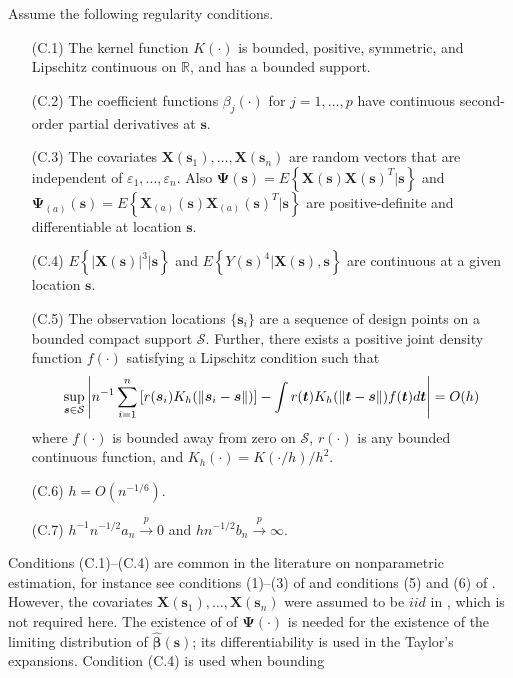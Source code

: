 \documentclass[authoryear,review, 12pt]{elsarticle}
\begin{document}
Assume the following regularity conditions.
\begin{itemize}
\item[(C.1)] The kernel function $K(\cdot)$ is bounded, positive, symmetric,
and Lipschitz continuous on $\mathbb{R}$, and has a bounded support.
\item[(C.2)] The coefficient functions $ $$\beta_{j}(\cdot)$ for $j=1,\dots,p$
have continuous second-order partial derivatives at $\bm{s}$.
\item[(C.3)] The covariates $\bm{X}(\bm{s}_{1}),\dots,\bm{X}(\bm{s}_{n})$ are
random vectors that are independent of $\varepsilon_{1},\dots,\varepsilon_{n}$.
Also $\bm{\Psi}(\bm{s})=E\left\{ \bm{X}(\bm{s})\bm{X}(\bm{s})^{T}|\bm{s}\right\} $
and $\bm{\Psi}_{(a)}(\bm{s})=E\left\{ \bm{X}_{(a)}(\bm{s})\bm{X}_{(a)}(\bm{s})^{T}|\bm{s}\right\} $
are positive-definite and differentiable at location $\bm{s}$.
\item[(C.4)] $E\left\{ \left|\bm{X}(\bm{s})\right|^{3}|\bm{s}\right\} $ and $E\left\{ Y(\bm{s})^{4}|\bm{X}(\bm{s}),\bm{s}\right\} $
are continuous at a given location $\bm{s}$.
\item[(C.5)] The observation locations $\{\bm{s}_{i}\}$ are a sequence of
design points on a bounded compact support $\mathcal{S}$. Further,
there exists a positive joint density function $f(\cdot)$ satisfying
a Lipschitz condition such that 
\[
\sup_{\bm{s}\text{\ensuremath{\in}}\mathcal{S}}\left|n^{-1}\sum_{i=1}^{n}\left[r(\bm{s}_{i})K_{h}(\|\bm{s}_{i}-\bm{s}\|)\right]-\int r(\bm{t})K_{h}(\|\bm{t}-\bm{s}\|)f(\bm{t})d\bm{t}\right|=O(h)
\]
where $f(\cdot)$ is bounded away from zero on $\mathcal{S}$, $r(\cdot)$
is any bounded continuous function, and $K_{h}(\cdot)=K(\cdot/h)/h^{2}$.
\item[(C.6)] $h=O\left(n^{-1/6}\right)$.
\item[(C.7)] $h^{-1}n^{-1/2}a_{n}\xrightarrow{p}0$ and $hn^{-1/2}b_{n}\xrightarrow{p}\infty$.
\end{itemize}
Conditions (C.1)--(C.4) are common in the literature on nonparametric
estimation, for instance see conditions (1)--(3) of \citet{Sun-Yan-Zhang-Lu-2014}
and conditions (5) and (6) of \citet{Cai-Fan-Li-2000}. However, the
covariates $\bm{X}(\bm{s}_{1}),\dots,\bm{X}(\bm{s}_{n})$ were assumed
to be $iid$ in \citet{Sun-Yan-Zhang-Lu-2014}, which is not required
here. The existence of of $\bm{\Psi}(\cdot)$ is needed for the existence
of the limiting distribution of $\hat{\bm{\beta}}(\bm{s})$; its differentiability
is used in the Taylor's expansions. Condition (C.4) is used when bounding
\end{document}
